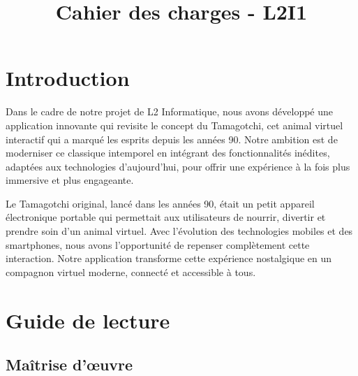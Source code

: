 \documentclass{cahier_des_charges}
\title{Cahier des charges - L2I1} %
\begin{document}




        
\fairemarges %
\fairepagedegarde %
\renewcommand{\contentsname}{Sommaire}
\tableofcontents %
\newpage




\section{Introduction} 

Dans le cadre de notre projet de L2 Informatique, nous avons développé une application innovante qui revisite le concept du Tamagotchi, cet animal virtuel interactif qui a marqué les esprits depuis les années 90. Notre ambition est de moderniser ce classique intemporel en intégrant des fonctionnalités inédites, adaptées aux technologies d’aujourd’hui, pour offrir une expérience à la fois plus immersive et plus engageante.

Le Tamagotchi original, lancé dans les années 90, était un petit appareil électronique portable qui permettait aux utilisateurs de nourrir, divertir et prendre soin d’un animal virtuel. Avec l’évolution des technologies mobiles et des smartphones, nous avons l’opportunité de repenser complètement cette interaction. Notre application transforme cette expérience nostalgique en un compagnon virtuel moderne, connecté et accessible à tous.


\section{Guide de lecture}

\subsection{Maîtrise d’œuvre}
\end{document}
